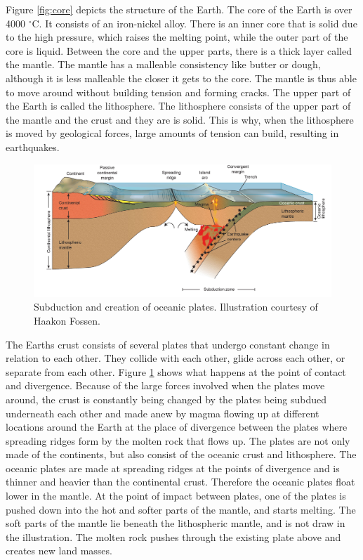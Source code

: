 \documentclass[a4paper,12pt]{report}
\begin{document}
Figure \ref{fig:core} depicts the structure of the Earth. The core of the Earth is over 4000 $^\circ$C. It consists of an iron-nickel alloy. There is an inner core that is solid due to the high pressure, which raises the melting point, while the outer part of the core is liquid. Between the core and the upper parts, there is a thick layer called the mantle. The mantle has a malleable consistency like butter or dough, although it is less malleable the closer it gets to the core. The mantle is thus able to move around without building tension and forming cracks. The upper part of the Earth is called the lithosphere. The lithosphere consists of the upper part of the mantle and the crust and they are is solid. This is why, when the lithosphere is moved by geological forces, large amounts of tension can build, resulting in earthquakes.

\begin{figure}[t]
 \includegraphics[width=\linewidth]{thesis/geo/english/subduksjon.jpg}
 \caption{Subduction and creation of oceanic plates. Illustration courtesy of Haakon Fossen.}
 \label{fig:fig99subduction}
\end{figure}

The Earths crust consists of several plates that undergo constant change in relation to each other. They collide with each other, glide across each other, or separate from each other. Figure \ref{fig:fig99subduction} shows what happens at the point of contact and divergence.  Because of the large forces involved when the plates move around, the crust is constantly being changed by the plates being subdued underneath each other and made anew by magma flowing up at different locations around the Earth at the place of divergence between the plates where spreading ridges form by the molten rock that flows up. The plates are not only made of the continents, but also consist of the oceanic crust and lithosphere. The oceanic plates are made at spreading ridges at the points of divergence and is thinner and heavier than the continental crust. Therefore the oceanic plates float lower in the mantle. At the point of impact between plates, one of the plates is pushed down into the hot and softer parts of the mantle, and 
starts melting. The soft parts of the mantle lie beneath the lithospheric mantle, and is not draw in the illustration. The molten rock pushes through the existing plate above and creates new land masses.
\end{document}
